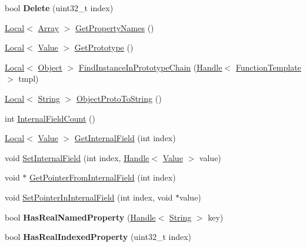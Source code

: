 \begin{DoxyCompactItemize}
\item 
\hypertarget{classv8_1_1_object_a63f88a22cb5d994eedc1efc79520bc42}{}bool {\bfseries Delete} (uint32\+\_\+t index)\label{classv8_1_1_object_a63f88a22cb5d994eedc1efc79520bc42}

\item 
\hyperlink{classv8_1_1_local}{Local}$<$ \hyperlink{classv8_1_1_array}{Array} $>$ \hyperlink{classv8_1_1_object_a9f45786246c6e6027b32f685d900a41f}{Get\+Property\+Names} ()
\item 
\hyperlink{classv8_1_1_local}{Local}$<$ \hyperlink{classv8_1_1_value}{Value} $>$ \hyperlink{classv8_1_1_object_ae8d3fed7d6dbd667c29cabb3039fe7af}{Get\+Prototype} ()
\item 
\hyperlink{classv8_1_1_local}{Local}$<$ \hyperlink{classv8_1_1_object}{Object} $>$ \hyperlink{classv8_1_1_object_ab2c5f7369abf08ae8f44dc84f5aa335a}{Find\+Instance\+In\+Prototype\+Chain} (\hyperlink{classv8_1_1_handle}{Handle}$<$ \hyperlink{classv8_1_1_function_template}{Function\+Template} $>$ tmpl)
\item 
\hyperlink{classv8_1_1_local}{Local}$<$ \hyperlink{classv8_1_1_string}{String} $>$ \hyperlink{classv8_1_1_object_aeb2f524c806075e5f9032a24afd86869}{Object\+Proto\+To\+String} ()
\item 
int \hyperlink{classv8_1_1_object_aaec28576353eebe6fee113bce2718ecc}{Internal\+Field\+Count} ()
\item 
\hyperlink{classv8_1_1_local}{Local}$<$ \hyperlink{classv8_1_1_value}{Value} $>$ \hyperlink{classv8_1_1_object_a99c6d30058de4b6e02ba3df8d328a059}{Get\+Internal\+Field} (int index)
\item 
void \hyperlink{classv8_1_1_object_a361b1781e7db29b17b063ef31315989e}{Set\+Internal\+Field} (int index, \hyperlink{classv8_1_1_handle}{Handle}$<$ \hyperlink{classv8_1_1_value}{Value} $>$ value)
\item 
void $\ast$ \hyperlink{classv8_1_1_object_a6944234b132c5b36155da2d2690c2fae}{Get\+Pointer\+From\+Internal\+Field} (int index)
\item 
void \hyperlink{classv8_1_1_object_a697c8b6945ab4cb4bf468414bb4c1234}{Set\+Pointer\+In\+Internal\+Field} (int index, void $\ast$value)
\item 
\hypertarget{classv8_1_1_object_a5c29998a9ec60802b052f528a1aaa7fd}{}bool {\bfseries Has\+Real\+Named\+Property} (\hyperlink{classv8_1_1_handle}{Handle}$<$ \hyperlink{classv8_1_1_string}{String} $>$ key)\label{classv8_1_1_object_a5c29998a9ec60802b052f528a1aaa7fd}

\item 
\hypertarget{classv8_1_1_object_a29dce0e7da968dae54614501f035f7e9}{}bool {\bfseries Has\+Real\+Indexed\+Property} (uint32\+\_\+t index)\label{classv8_1_1_object_a29dce0e7da968dae54614501f035f7e9}


\end{DoxyCompactItemize}
